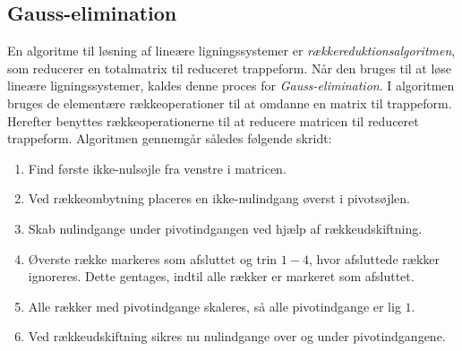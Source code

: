 \newpage
\subsection{Gauss-elimination}
\label{gauss}
En algoritme til løsning af lineære ligningssystemer er  \textit{rækkereduktionsalgoritmen}, som reducerer en totalmatrix til reduceret trappeform.
Når den bruges til at løse lineære ligningssystemer, kaldes denne proces for \textit{Gauss-elimination}.
I algoritmen bruges de elementære rækkeoperationer til at omdanne en matrix til trappeform. 
Herefter benyttes rækkeoperationerne til at reducere matricen til reduceret trappeform.
Algoritmen gennemgår således følgende skridt:
%
\begin{enumerate}
\item Find første ikke-nulsøjle fra venstre i matricen.
\item Ved rækkeombytning placeres en ikke-nulindgang øverst i pivotsøjlen.
\item Skab nulindgange under pivotindgangen ved hjælp af rækkeudskiftning.
\item Øverste række markeres som afsluttet og trin $1-4$, hvor afsluttede rækker ignoreres.
Dette gentages, indtil alle rækker er markeret som afsluttet.
\item Alle rækker med pivotindgange skaleres, så alle pivotindgange er lig $1$.
\item Ved rækkeudskiftning sikres nu nulindgange over og under pivotindgangene.
\end{enumerate}
%
